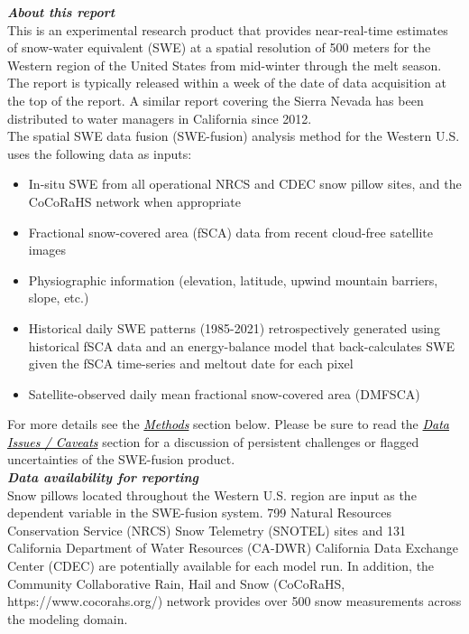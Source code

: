 \documentclass{article}
\begin{document}
\noindent\textbf{\textit{About this report}}\\
This is an experimental research product that provides near-real-time estimates of snow-water equivalent (SWE) at a spatial resolution of 500 meters for the Western region of the United States from mid-winter through the melt season. The report is typically released within a week of the date of data acquisition at the top of the report. A similar report covering the Sierra Nevada has been distributed to water managers in California since 2012.\\

\noindent
The spatial SWE data fusion (SWE-fusion) analysis method for the Western U.S. uses the following data as inputs:
\begin{itemize}[label=-]
    \item In-situ SWE from all operational NRCS and CDEC snow pillow sites, and the CoCoRaHS network when appropriate
    \item Fractional snow-covered area (fSCA) data from recent cloud-free satellite images
    \item Physiographic information (elevation, latitude, upwind mountain barriers, slope, etc.)
    \item Historical daily SWE patterns (1985-2021) retrospectively generated using historical fSCA data and an energy-balance model that back-calculates SWE given the fSCA time-series and meltout date for each pixel
    \item Satellite-observed daily mean fractional snow-covered area (DMFSCA)
\end{itemize}

\noindent For more details see the \hyperref[sec:methods]{\textcolor{black}{\textit{Methods}}} section below. Please be sure to read the \hyperref[sec:data_issues]{\textcolor{black}{\textit{Data Issues / Caveats}}} section for a discussion of persistent challenges or flagged uncertainties of the SWE-fusion product.\\

\noindent\textbf{\textit{Data availability for reporting}}\\
Snow pillows located throughout the Western U.S. region are input as the dependent variable in the SWE-fusion system. 799 Natural Resources Conservation Service (NRCS) Snow Telemetry (SNOTEL) sites and 131 California Department of Water Resources (CA-DWR) California Data Exchange Center (CDEC) are potentially available for each model run. In addition, the Community Collaborative Rain, Hail and Snow (CoCoRaHS, https://www.cocorahs.org/) network provides over 500 snow measurements across the modeling domain.\\
\end{document}
